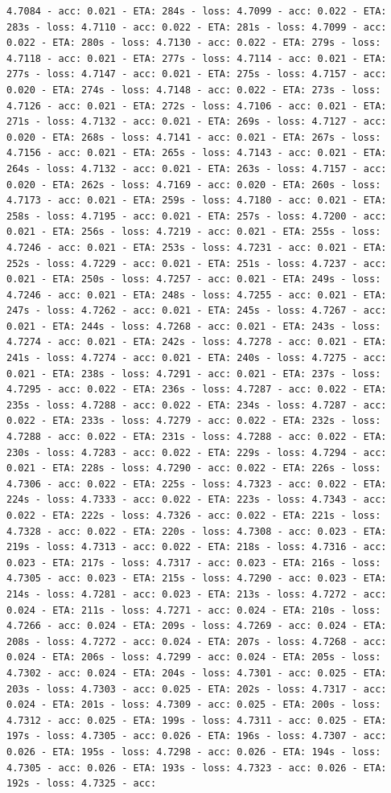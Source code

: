 \documentclass[11pt]{article}
\begin{document}
\begin{Verbatim}[commandchars=\\\{\}]
4.7084 - acc: 0.021 - ETA: 284s - loss: 4.7099 - acc: 0.022 - ETA: 283s - loss: 4.7110 - acc: 0.022 - ETA: 281s - loss: 4.7099 - acc: 0.022 - ETA: 280s - loss: 4.7130 - acc: 0.022 - ETA: 279s - loss: 4.7118 - acc: 0.021 - ETA: 277s - loss: 4.7114 - acc: 0.021 - ETA: 277s - loss: 4.7147 - acc: 0.021 - ETA: 275s - loss: 4.7157 - acc: 0.020 - ETA: 274s - loss: 4.7148 - acc: 0.022 - ETA: 273s - loss: 4.7126 - acc: 0.021 - ETA: 272s - loss: 4.7106 - acc: 0.021 - ETA: 271s - loss: 4.7132 - acc: 0.021 - ETA: 269s - loss: 4.7127 - acc: 0.020 - ETA: 268s - loss: 4.7141 - acc: 0.021 - ETA: 267s - loss: 4.7156 - acc: 0.021 - ETA: 265s - loss: 4.7143 - acc: 0.021 - ETA: 264s - loss: 4.7132 - acc: 0.021 - ETA: 263s - loss: 4.7157 - acc: 0.020 - ETA: 262s - loss: 4.7169 - acc: 0.020 - ETA: 260s - loss: 4.7173 - acc: 0.021 - ETA: 259s - loss: 4.7180 - acc: 0.021 - ETA: 258s - loss: 4.7195 - acc: 0.021 - ETA: 257s - loss: 4.7200 - acc: 0.021 - ETA: 256s - loss: 4.7219 - acc: 0.021 - ETA: 255s - loss: 4.7246 - acc: 0.021 - ETA: 253s - loss: 4.7231 - acc: 0.021 - ETA: 252s - loss: 4.7229 - acc: 0.021 - ETA: 251s - loss: 4.7237 - acc: 0.021 - ETA: 250s - loss: 4.7257 - acc: 0.021 - ETA: 249s - loss: 4.7246 - acc: 0.021 - ETA: 248s - loss: 4.7255 - acc: 0.021 - ETA: 247s - loss: 4.7262 - acc: 0.021 - ETA: 245s - loss: 4.7267 - acc: 0.021 - ETA: 244s - loss: 4.7268 - acc: 0.021 - ETA: 243s - loss: 4.7274 - acc: 0.021 - ETA: 242s - loss: 4.7278 - acc: 0.021 - ETA: 241s - loss: 4.7274 - acc: 0.021 - ETA: 240s - loss: 4.7275 - acc: 0.021 - ETA: 238s - loss: 4.7291 - acc: 0.021 - ETA: 237s - loss: 4.7295 - acc: 0.022 - ETA: 236s - loss: 4.7287 - acc: 0.022 - ETA: 235s - loss: 4.7288 - acc: 0.022 - ETA: 234s - loss: 4.7287 - acc: 0.022 - ETA: 233s - loss: 4.7279 - acc: 0.022 - ETA: 232s - loss: 4.7288 - acc: 0.022 - ETA: 231s - loss: 4.7288 - acc: 0.022 - ETA: 230s - loss: 4.7283 - acc: 0.022 - ETA: 229s - loss: 4.7294 - acc: 0.021 - ETA: 228s - loss: 4.7290 - acc: 0.022 - ETA: 226s - loss: 4.7306 - acc: 0.022 - ETA: 225s - loss: 4.7323 - acc: 0.022 - ETA: 224s - loss: 4.7333 - acc: 0.022 - ETA: 223s - loss: 4.7343 - acc: 0.022 - ETA: 222s - loss: 4.7326 - acc: 0.022 - ETA: 221s - loss: 4.7328 - acc: 0.022 - ETA: 220s - loss: 4.7308 - acc: 0.023 - ETA: 219s - loss: 4.7313 - acc: 0.022 - ETA: 218s - loss: 4.7316 - acc: 0.023 - ETA: 217s - loss: 4.7317 - acc: 0.023 - ETA: 216s - loss: 4.7305 - acc: 0.023 - ETA: 215s - loss: 4.7290 - acc: 0.023 - ETA: 214s - loss: 4.7281 - acc: 0.023 - ETA: 213s - loss: 4.7272 - acc: 0.024 - ETA: 211s - loss: 4.7271 - acc: 0.024 - ETA: 210s - loss: 4.7266 - acc: 0.024 - ETA: 209s - loss: 4.7269 - acc: 0.024 - ETA: 208s - loss: 4.7272 - acc: 0.024 - ETA: 207s - loss: 4.7268 - acc: 0.024 - ETA: 206s - loss: 4.7299 - acc: 0.024 - ETA: 205s - loss: 4.7302 - acc: 0.024 - ETA: 204s - loss: 4.7301 - acc: 0.025 - ETA: 203s - loss: 4.7303 - acc: 0.025 - ETA: 202s - loss: 4.7317 - acc: 0.024 - ETA: 201s - loss: 4.7309 - acc: 0.025 - ETA: 200s - loss: 4.7312 - acc: 0.025 - ETA: 199s - loss: 4.7311 - acc: 0.025 - ETA: 197s - loss: 4.7305 - acc: 0.026 - ETA: 196s - loss: 4.7307 - acc: 0.026 - ETA: 195s - loss: 4.7298 - acc: 0.026 - ETA: 194s - loss: 4.7305 - acc: 0.026 - ETA: 193s - loss: 4.7323 - acc: 0.026 - ETA: 192s - loss: 4.7325 - acc: 
\end{Verbatim}
\end{document}
